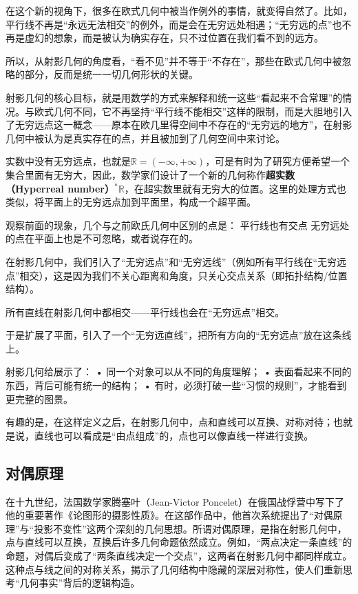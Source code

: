 在这个新的视角下，很多在欧式几何中被当作例外的事情，就变得自然了。比如，平行线不再是“永远无法相交”的例外，而是会在无穷远处相遇；“无穷远的点”也不再是虚幻的想象，而是被认为确实存在，只不过位置在我们看不到的远方。

所以，从射影几何的角度看，“看不见”并不等于“不存在”，那些在欧式几何中被忽略的部分，反而是统一一切几何形状的关键。

射影几何的核心目标，就是用数学的方式来解释和统一这些“看起来不合常理”的情况。与欧式几何不同，它不再坚持“平行线不能相交”这样的限制，而是大胆地引入了无穷远点这一概念——原本在欧几里得空间中不存在的“无穷远的地方”，在射影几何中被认为是真实存在的点，并且被加到了几何空间中来讨论。




实数中没有无穷远点，也就是$\mathbb{R}=(-\infty,+\infty)$，可是有时为了研究方便希望一个集合里面有无穷大，因此，数学家们设计了一个新的几何称作\textbf{超实数（Hyperreal number）}$^*\mathbb{R}$，在超实数里就有无穷大的位置。这里的处理方式也类似，将平面上的无穷远点加到平面里，构成一个超平面。

观察前面的现象，几个与之前欧氏几何中区别的点是：
平行线也有交点
无穷远处的点在平面上也是不可忽略，或者说存在的。




在射影几何中，我们引入了“无穷远点”和“无穷远线”（例如所有平行线在“无穷远点”相交），这是因为我们不关心距离和角度，只关心交点关系（即拓扑结构/位置结构）。

所有直线在射影几何中都相交——平行线也会在“无穷远点”相交。

于是扩展了平面，引入了一个“无穷远直线”，把所有方向的“无穷远点”放在这条线上。

射影几何给展示了：
	•	同一个对象可以从不同的角度理解；
	•	表面看起来不同的东西，背后可能有统一的结构；
	•	有时，必须打破一些“习惯的规则”，才能看到更完整的图景。

有趣的是，在这样定义之后，在射影几何中，点和直线可以互换、对称对待；也就是说，直线也可以看成是“由点组成”的，点也可以像直线一样进行变换。


\subsection{对偶原理}

在十九世纪，法国数学家腾塞叶（Jean-Victor Poncelet）在俄国战俘营中写下了他的重要著作《论图形的摄影性质》。在这部作品中，他首次系统提出了“对偶原理”与“投影不变性”这两个深刻的几何思想。所谓对偶原理，是指在射影几何中，点与直线可以互换，互换后许多几何命题依然成立。例如，“两点决定一条直线”的命题，对偶后变成了“两条直线决定一个交点”，这两者在射影几何中都同样成立。这种点与线之间的对称关系，揭示了几何结构中隐藏的深层对称性，使人们重新思考“几何事实”背后的逻辑构造。

